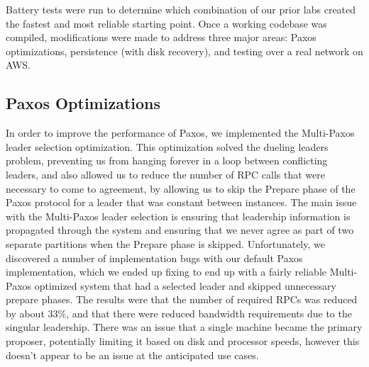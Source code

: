 \documentclass[letterpaper,10pt]{article}
\begin{document}
Battery tests were run to determine which combination of our prior
labs created the fastest and most reliable starting point.  Once a
working codebase was compiled, modifications were made to address
three major areas: Paxos optimizations, persistence (with disk
recovery), and testing over a real network on AWS.

\subsection{Paxos Optimizations}
In order to improve the performance of Paxos, we implemented the
Multi-Paxos leader selection optimization. This optimization solved
the dueling leaders problem, preventing us from hanging forever in a
loop between conflicting leaders, and also allowed us to reduce the
number of RPC calls that were necessary to come to agreement, by
allowing us to skip the Prepare phase of the Paxos protocol for a
leader that was constant between instances. The main issue with the
Multi-Paxos leader selection is ensuring that leadership information
is propagated through the system and ensuring that we never agree as
part of two separate partitions when the Prepare phase is
skipped. Unfortunately, we discovered a number of implementation bugs
with our default Paxos implementation, which we ended up fixing to end
up with a fairly reliable Multi-Paxos optimized system that had a
selected leader and skipped unnecessary prepare phases. The results
were that the number of required RPCs was reduced by about 33\%, and
that there were reduced bandwidth requirements due to the singular
leadership. There was an issue that a single machine became the
primary proposer, potentially limiting it based on disk and processor
speeds, however this doesn't appear to be an issue at the anticipated
use cases.
\end{document}
